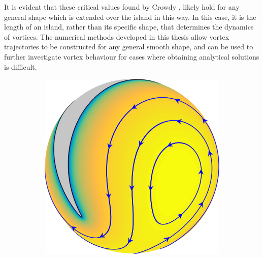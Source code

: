 \documentclass{sfuthesis}
\begin{document}
It is evident that these critical values found by Crowdy \cite{Crowdy2006}, likely hold for any general shape which is extended over the island in this way. In this case, it is the length of an island, rather than its specific shape, that determines the dynamics of vortices. The numerical methods developed in this thesis allow vortex trajectories to be constructed for any general smooth shape, and can be used to further investigate vortex behaviour for cases where obtaining analytical solutions is difficult.

\begin{figure}[h]
	\centering
  	\begin{subfigure}[b]{0.3\textwidth}
		\includegraphics[width=\textwidth]{Ex6-8LongIslandSideView}
     	\end{subfigure}\hspace{0.3cm}
      	\begin{subfigure}[b]{0.3\textwidth}

\end{subfigure}
\end{figure}
\end{document}

